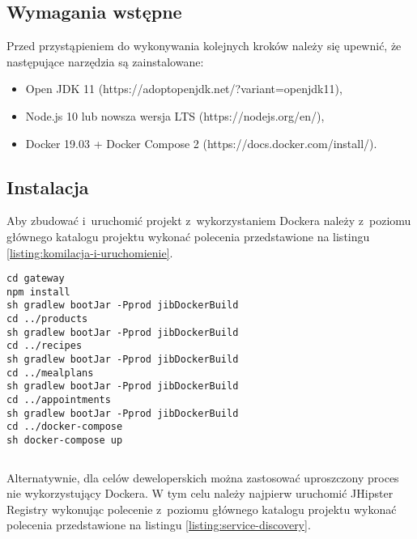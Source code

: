 \subsection{Wymagania wstępne}\label{subsec:prerequirements}
Przed przystąpieniem do wykonywania kolejnych kroków należy się upewnić, że następujące narzędzia są zainstalowane:
\begin{itemize}
    \item Open JDK 11 (https://adoptopenjdk.net/?variant=openjdk11),
    \item Node.js 10 lub nowsza wersja LTS (https://nodejs.org/en/),
    \item Docker 19.03 + Docker Compose 2 (https://docs.docker.com/install/).
\end{itemize}

\subsection{Instalacja}\label{subsec:installation}

Aby zbudować i~uruchomić projekt z~wykorzystaniem Dockera należy z~poziomu głównego katalogu projektu
wykonać polecenia przedstawione na listingu \ref{listing:komilacja-i-uruchomienie}.

\noindent\hspace{.075\textwidth}\begin{minipage}{.85\textwidth}
    \begin{verbatim}
cd gateway
npm install
sh gradlew bootJar -Pprod jibDockerBuild
cd ../products
sh gradlew bootJar -Pprod jibDockerBuild
cd ../recipes
sh gradlew bootJar -Pprod jibDockerBuild
cd ../mealplans
sh gradlew bootJar -Pprod jibDockerBuild
cd ../appointments
sh gradlew bootJar -Pprod jibDockerBuild
cd ../docker-compose
sh docker-compose up
    \end{verbatim}
    \begin{lstlisting}[caption={Skrypt kompilujący wszystkie mikroserwisy i~uruchamiający aplikację na Dockerze \source{\ownwork}}, label={listing:komilacja-i-uruchomienie}]
\end{lstlisting}
\end{minipage}

Alternatywnie, dla celów deweloperskich można zastosować uproszczony proces nie wykorzystujący Dockera.
W tym celu należy najpierw uruchomić JHipster Registry wykonując polecenie z~poziomu głównego katalogu projektu
wykonać polecenia przedstawione na listingu \ref{listing:service-discovery}.


